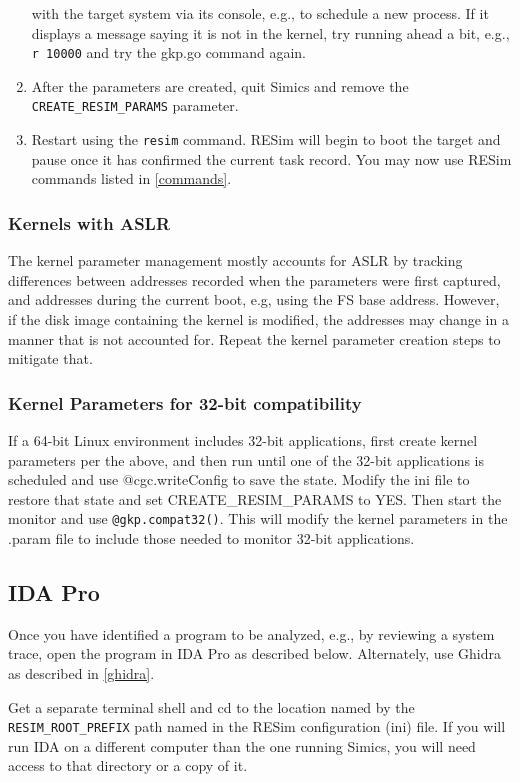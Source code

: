 \documentclass[titlepage]{article}
\begin{document}
\begin{enumerate}
with the target system via its console, e.g., to schedule a new process.  If it displays a message saying it is not in the kernel,
try running ahead a bit, e.g., {\tt r 10000} and try the gkp.go command again.
\item After the parameters are created, quit Simics and remove the {\tt CREATE\_RESIM\_PARAMS} parameter.
\item Restart using the {\tt resim} command.  RESim will begin to boot the target and pause once it has confirmed the current task record.  You
may now use RESim commands listed in \ref{commands}.
\end{enumerate}

\subsubsection{Kernels with ASLR}
The kernel parameter management mostly accounts for ASLR by tracking differences between addresses recorded when the parameters were first
captured, and addresses during the current boot, e.g, using the FS base address.  However, if the disk image containing the kernel is modified,
the addresses may change in a manner that is not accounted for.  Repeat the kernel parameter creation steps to mitigate that.

\subsubsection{Kernel Parameters for 32-bit compatibility}
If a 64-bit Linux environment includes 32-bit applications, first create kernel parameters per the above, and then run until one of the 32-bit applications
is scheduled and use @cgc.writeConfig to save
the state.  Modify the ini file to restore that state and set CREATE\_RESIM\_PARAMS to YES.  Then start the monitor and use
{\tt @gkp.compat32()}.  This will modify the kernel parameters in the .param file to include those needed to monitor 32-bit applications.

\subsection{IDA Pro}
\label{ida}
Once you have identified a program to be analyzed, e.g., by reviewing a system trace, open the program in IDA Pro as described below.
Alternately, use Ghidra as described in \ref{ghidra}.

Get a separate terminal shell and cd to the location named by the {\tt RESIM\_ROOT\_PREFIX} path named in the RESim configuration (ini) file.  
If you will run IDA on a different computer than the one running Simics, you will need access to that directory or a copy of it.
\end{document}
